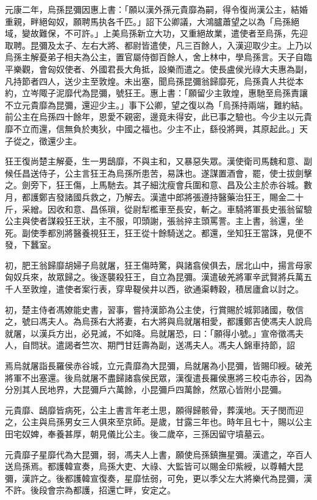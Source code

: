 \begin{pinyinscope}
元康二年，烏孫昆彌因惠上書：「願以漢外孫元貴靡為嗣，得令復尚漢公主，結婚重親，畔絕匈奴，願聘馬执各千匹。」詔下公卿議，大鴻臚蕭望之以為「烏孫絕域，變故難保，不可許。」上美烏孫新立大功，又重絕故業，遣使者至烏孫，先迎取聘。昆彌及太子、左右大將、都尉皆遣使，凡三百餘人，入漢迎取少主。上乃以烏孫主解憂弟子相夫為公主，置官屬侍御百餘人，舍上林中，學烏孫言。天子自臨平樂觀，會匈奴使者、外國君長大角抵，設樂而遣之。使長盧侯光祿大夫惠為副，凡持節者四人，送少主至敦煌。未出塞，聞烏孫昆彌翁歸靡死，烏孫貴人共從本約，立岑陬子泥靡代為昆彌，號狂王。惠上書：「願留少主敦煌，惠馳至烏孫責讓不立元貴靡為昆彌，還迎少主。」事下公卿，望之復以為「烏孫持兩端，難約結。前公主在烏孫四十餘年，恩愛不親密，邊竟未得安，此已事之驗也。今少主以元貴靡不立而還，信無負於夷狄，中國之福也。少主不止，繇役將興，其原起此。」天子從之，徵還少主。

狂王復尚楚主解憂，生一男鴟靡，不與主和，又暴惡失眾。漢使衛司馬魏和意、副候任昌送侍子，公主言狂王為烏孫所患苦，易誅也。遂謀置酒會，罷，使士拔劍擊之。劍旁下，狂王傷，上馬馳去。其子細沈瘦會兵圍和意、昌及公主於赤谷城。數月，都護鄭吉發諸國兵救之，乃解去。漢遣中郎將張遵持醫藥治狂王，賜金二十斤，采繒。因收和意、昌係瑣，從尉犁檻車至長安，斬之。車騎將軍長史張翁留驗公主與使者謀殺狂王狀，主不服，叩頭謝，張翁捽主頭罵詈。主上書，翁還，坐死。副使季都別將醫養視狂王，狂王從十餘騎送之。都還，坐知狂王當誅，見便不發，下蠶室。

初，肥王翁歸靡胡婦子烏就屠，狂王傷時驚，與諸翕侯俱去，居北山中，揚言母家匈奴兵來，故眾歸之。後逐襲殺狂王，自立為昆彌。漢遣破羌將軍辛武賢將兵萬五千人至敦煌，遣使者案行表，穿卑鞮侯井以西，欲通渠轉穀，積居廬倉以討之。

初，楚主侍者馮嫽能史書，習事，嘗持漢節為公主使，行賞賜於城郭諸國，敬信之，號曰馮夫人。為烏孫右大將妻，右大將與烏就屠相愛，都護鄭吉使馮夫人說烏就屠，以漢兵方出，必見滅，不如降。烏就屠恐，曰：「願得小號。」宣帝徵馮夫人，自問狀。遣謁者竺次、期門甘廷壽為副，送馮夫人。馮夫人錦車持節，詔

焉烏就屠詣長羅侯赤谷城，立元貴靡為大昆彌，烏就屠為小昆彌，皆賜印綬。破羌將軍不出塞還。後烏就屠不盡歸諸翕侯民眾，漢復遣長羅侯惠將三校屯赤谷，因為分別其人民地界，大昆彌戶六萬餘，小昆彌戶四萬餘，然眾心皆附小昆彌。

元貴靡、鴟靡皆病死，公主上書言年老土思，願得歸骸骨，葬漢地。天子閔而迎之，公主與烏孫男女三人俱來至京師。是歲，甘露三年也。時年且七十，賜以公主田宅奴婢，奉養甚厚，朝見儀比公主。後二歲卒，三孫因留守墳墓云。

元貴靡子星靡代為大昆彌，弱，馮夫人上書，願使烏孫鎮撫星彌。漢遣之，卒百人送烏孫焉。都護韓宣奏，烏孫大吏、大祿、大監皆可以賜金印紫綬，以尊輔大昆彌，漢許之。後都護韓宣復奏，星靡怯弱，可免，更以季父左大將樂代為昆彌，漢不許。後段會宗為都護，招還亡畔，安定之。


\end{pinyinscope}
